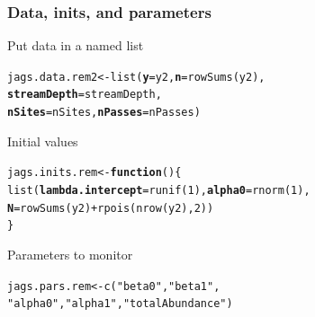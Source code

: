 \documentclass[color=usenames,dvipsnames]{beamer}\usepackage[]{graphicx}\usepackage[]{xcolor}
\makeatletter
\newcommand{\hlnum}[1]{\textcolor[rgb]{0.69,0.494,0}{#1}}%
\newcommand{\hlsng}[1]{\textcolor[rgb]{0.749,0.012,0.012}{#1}}%
\newcommand{\hlopt}[1]{\textcolor[rgb]{0,0,0}{#1}}%
\newcommand{\hldef}[1]{\textcolor[rgb]{0,0,0}{#1}}%
\newcommand{\hlkwa}[1]{\textcolor[rgb]{0,0,0}{\textbf{#1}}}%
\newcommand{\hlkwb}[1]{\textcolor[rgb]{0,0.341,0.682}{#1}}%
\newcommand{\hlkwc}[1]{\textcolor[rgb]{0,0,0}{\textbf{#1}}}%
\newcommand{\hlkwd}[1]{\textcolor[rgb]{0.004,0.004,0.506}{#1}}%
\newenvironment{kframe}{%
 \def\at@end@of@kframe{}%
 \ifinner\ifhmode%
  \def\at@end@of@kframe{\end{minipage}}%
  \begin{minipage}{\columnwidth}%
 \fi\fi%
 \def\FrameCommand##1{\hskip\@totalleftmargin \hskip-\fboxsep
 \colorbox{shadecolor}{##1}\hskip-\fboxsep
     \hskip-\linewidth \hskip-\@totalleftmargin \hskip\columnwidth}%
 \MakeFramed {\advance\hsize-\width
   \@totalleftmargin\z@ \linewidth\hsize
   \@setminipage}}%
 {\par\unskip\endMakeFramed%
 \at@end@of@kframe}
\newenvironment{knitrout}{}{} %
\makeatother
\begin{document}
\begin{frame}[fragile]
  \frametitle{Data, inits, and parameters}
  Put data in a named list
  \vspace{-12pt}
\begin{knitrout}\small
{}\color{fgcolor}\begin{kframe}
\begin{alltt}
\hldef{jags.data.rem2} \hlkwb{<-} \hlkwd{list}\hldef{(}\hlkwc{y}\hldef{=y2,} \hlkwc{n}\hldef{=}\hlkwd{rowSums}\hldef{(y2),}
                       \hlkwc{streamDepth}\hldef{=streamDepth,}
                       \hlkwc{nSites}\hldef{=nSites,} \hlkwc{nPasses}\hldef{=nPasses)}
\end{alltt}
\end{kframe}
\end{knitrout}
\pause
\vfill
  Initial values
  \vspace{-12pt}
\begin{knitrout}\small
{}\color{fgcolor}\begin{kframe}
\begin{alltt}
\hldef{jags.inits.rem} \hlkwb{<-} \hlkwa{function}\hldef{() \{}
    \hlkwd{list}\hldef{(}\hlkwc{lambda.intercept}\hldef{=}\hlkwd{runif}\hldef{(}\hlnum{1}\hldef{),} \hlkwc{alpha0}\hldef{=}\hlkwd{rnorm}\hldef{(}\hlnum{1}\hldef{),}
         \hlkwc{N}\hldef{=}\hlkwd{rowSums}\hldef{(y2)}\hlopt{+}\hlkwd{rpois}\hldef{(}\hlkwd{nrow}\hldef{(y2),} \hlnum{2}\hldef{))}
\hldef{\}}
\end{alltt}
\end{kframe}
\end{knitrout}
\pause
\vfill
  Parameters to monitor
  \vspace{-12pt}
\begin{knitrout}\small
{}\color{fgcolor}\begin{kframe}
\begin{alltt}
\hldef{jags.pars.rem} \hlkwb{<-} \hlkwd{c}\hldef{(}\hlsng{"beta0"}\hldef{,} \hlsng{"beta1"}\hldef{,}
                   \hlsng{"alpha0"}\hldef{,} \hlsng{"alpha1"}\hldef{,} \hlsng{"totalAbundance"}\hldef{)}
\end{alltt}
\end{kframe}
\end{knitrout}
\end{frame}
\end{document}
